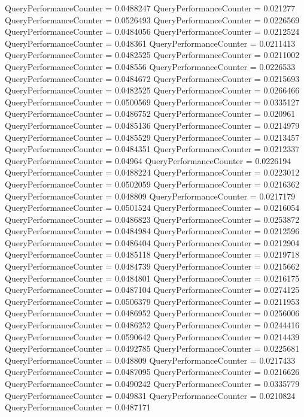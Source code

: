 \documentclass[9pt]{article}
\theoremstyle{plain}
\theoremstyle{definition}
\theoremstyle{remark}
\numberwithin{equation}{section}
\begin{document}
QueryPerformanceCounter  =  0.0488247
QueryPerformanceCounter  =  0.021277
QueryPerformanceCounter  =  0.0526493
QueryPerformanceCounter  =  0.0226569
QueryPerformanceCounter  =  0.0484056
QueryPerformanceCounter  =  0.0212524
QueryPerformanceCounter  =  0.048361
QueryPerformanceCounter  =  0.0211413
QueryPerformanceCounter  =  0.0482525
QueryPerformanceCounter  =  0.0211002
QueryPerformanceCounter  =  0.048556
QueryPerformanceCounter  =  0.0226533
QueryPerformanceCounter  =  0.0484672
QueryPerformanceCounter  =  0.0215693
QueryPerformanceCounter  =  0.0482525
QueryPerformanceCounter  =  0.0266466
QueryPerformanceCounter  =  0.0500569
QueryPerformanceCounter  =  0.0335127
QueryPerformanceCounter  =  0.0486752
QueryPerformanceCounter  =  0.020961
QueryPerformanceCounter  =  0.0485136
QueryPerformanceCounter  =  0.0214979
QueryPerformanceCounter  =  0.0485529
QueryPerformanceCounter  =  0.0213457
QueryPerformanceCounter  =  0.0484351
QueryPerformanceCounter  =  0.0212337
QueryPerformanceCounter  =  0.04964
QueryPerformanceCounter  =  0.0226194
QueryPerformanceCounter  =  0.0488224
QueryPerformanceCounter  =  0.0223012
QueryPerformanceCounter  =  0.0502059
QueryPerformanceCounter  =  0.0216362
QueryPerformanceCounter  =  0.048809
QueryPerformanceCounter  =  0.0217179
QueryPerformanceCounter  =  0.0501524
QueryPerformanceCounter  =  0.0216054
QueryPerformanceCounter  =  0.0486823
QueryPerformanceCounter  =  0.0253872
QueryPerformanceCounter  =  0.0484984
QueryPerformanceCounter  =  0.0212596
QueryPerformanceCounter  =  0.0486404
QueryPerformanceCounter  =  0.0212904
QueryPerformanceCounter  =  0.0485118
QueryPerformanceCounter  =  0.0219718
QueryPerformanceCounter  =  0.0484739
QueryPerformanceCounter  =  0.0215662
QueryPerformanceCounter  =  0.0484801
QueryPerformanceCounter  =  0.0216175
QueryPerformanceCounter  =  0.0487104
QueryPerformanceCounter  =  0.0274125
QueryPerformanceCounter  =  0.0506379
QueryPerformanceCounter  =  0.0211953
QueryPerformanceCounter  =  0.0486952
QueryPerformanceCounter  =  0.0256006
QueryPerformanceCounter  =  0.0486252
QueryPerformanceCounter  =  0.0244416
QueryPerformanceCounter  =  0.0590642
QueryPerformanceCounter  =  0.0214439
QueryPerformanceCounter  =  0.0492785
QueryPerformanceCounter  =  0.0225681
QueryPerformanceCounter  =  0.048809
QueryPerformanceCounter  =  0.0217433
QueryPerformanceCounter  =  0.0487095
QueryPerformanceCounter  =  0.0216626
QueryPerformanceCounter  =  0.0490242
QueryPerformanceCounter  =  0.0335779
QueryPerformanceCounter  =  0.049831
QueryPerformanceCounter  =  0.0210824
QueryPerformanceCounter  =  0.0487171
\end{document}
